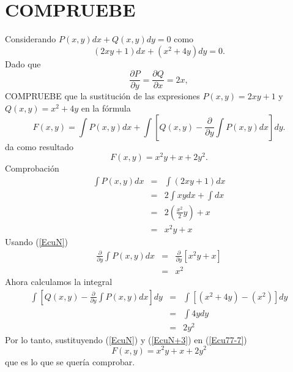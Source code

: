 \documentclass[12pt]{article}
\begin{document}
 \section{COMPRUEBE}
 Considerando $P(x,y)dx+Q(x,y)dy=0$ como
 \begin{equation}
 (2xy+1)dx+(x^{2}+4y)dy=0.
\end{equation}
Dado que
\begin{equation}
 \frac{\partial P}{\partial y}=
\frac{\partial Q}{\partial x}=2x,
\end{equation}
 COMPRUEBE que la sustituci\'{o}n de las expresiones $P(x,y)=2xy+1$ y $Q(x,y)=x^{2}+4y$ en la f\'{o}rmula
 \begin{equation}
 F(x,y)=\int P(x,y)dx+
\int\left[Q(x,y)-
\frac{\partial}{\partial y}\int P(x,y)dx\right]dy.
\label{Ecu77-7}
\end{equation}
 da como resultado
\begin{equation}
 F(x,y)=x^{2}y+x+2y^{2}.
\end{equation}
Comprobaci\'{o}n
\begin{eqnarray}
 \int P(x,y)dx&=&\int (2xy+1)dx\\
 &=&2\int xydx+\int dx\\
 &=&2(\frac{x^{2}}{2}y)+x\\
 &=&x^{2}y+x
 \label{EcuN}
\end{eqnarray}
Usando (\ref{EcuN})
\begin{eqnarray}
 \frac{\partial}{\partial y}\int P(x,y)dx&=&\frac{\partial}{\partial y}\left[x^{2}y+x\right]\\
 &=&x^{2}
\end{eqnarray}
Ahora calculamos la integral
\begin{eqnarray}
\int\left[Q(x,y)-
\frac{\partial}{\partial y}\int P(x,y)dx\right]dy&=&\int\left[(x^{2}+4y)-(x^{2})\right]dy\\
&=&\int4ydy\\
&=&2y^{2}
\label{EcuN+3}
\end{eqnarray}
Por lo tanto, sustituyendo (\ref{EcuN}) y (\ref{EcuN+3}) en (\ref{Ecu77-7})
\begin{equation}
 F(x,y)=x^{2}y+x+2y^{2}
\end{equation}
que es lo que se quer\'{i}a comprobar.
\end{document}
